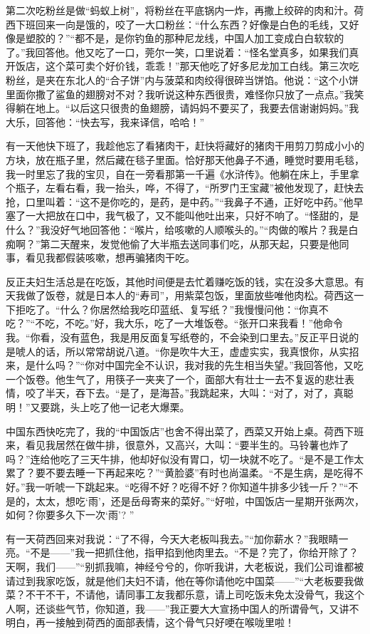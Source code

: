 \par 第二次吃粉丝是做“蚂蚁上树”，将粉丝在平底锅内一炸，再撒上绞碎的肉和汁。荷西下班回来一向是饿的，咬了一大口粉丝：“什么东西？好像是白色的毛线，又好像是塑胶的？”“都不是，是你钓鱼的那种尼龙线，中国人加工变成白白软软的了。”我回答他。他又吃了一口，莞尔一笑，口里说着：“怪名堂真多，如果我们真开饭店，这个菜可卖个好价钱，乖乖！”那天他吃了好多尼龙加工白线。第三次吃粉丝，是夹在东北人的“合子饼”内与菠菜和肉绞得很碎当饼馅。他说：“这个小饼里面你撒了鲨鱼的翅膀对不对？我听说这种东西很贵，难怪你只放了一点点。”我笑得躺在地上。“以后这只很贵的鱼翅膀，请妈妈不要买了，我要去信谢谢妈妈。”我大乐，回答他：“快去写，我来译信，哈哈！”
\par 有一天他快下班了，我趁他忘了看猪肉干，赶快将藏好的猪肉干用剪刀剪成小小的方块，放在瓶子里，然后藏在毯子里面。恰好那天他鼻子不通，睡觉时要用毛毯，我一时里忘了我的宝贝，自在一旁看那第一千遍《水浒传》。他躺在床上，手里拿个瓶子，左看右看，我一抬头，哗，不得了，“所罗门王宝藏”被他发现了，赶快去抢，口里叫着：“这不是你吃的，是药，是中药。”“我鼻子不通，正好吃中药。”他早塞了一大把放在口中，我气极了，又不能叫他吐出来，只好不响了。“怪甜的，是什么？”我没好气地回答他：“喉片，给咳嗽的人顺喉头的。”“肉做的喉片？我是白痴啊？”第二天醒来，发觉他偷了大半瓶去送同事们吃，从那天起，只要是他同事，看见我都假装咳嗽，想再骗猪肉干吃。
\par 反正夫妇生活总是在吃饭，其他时间便是去忙着赚吃饭的钱，实在没多大意思。有天我做了饭卷，就是日本人的“寿司”，用紫菜包饭，里面放些唯他肉松。荷西这一下拒吃了。“什么？你居然给我吃印蓝纸、复写纸？”我慢慢问他：“你真不吃？”“不吃，不吃。”好，我大乐，吃了一大堆饭卷。“张开口来我看！”他命令我。“你看，没有蓝色，我是用反面复写纸卷的，不会染到口里去。”反正平日说的是唬人的话，所以常常胡说八道。“你是吹牛大王，虚虚实实，我真恨你，从实招来，是什么吗？”“你对中国完全不认识，我对我的先生相当失望。”我回答他，又吃一个饭卷。他生气了，用筷子一夹夹了一个，面部大有壮士一去不复返的悲壮表情，咬了半天，吞下去。“是了，是海苔。”我跳起来，大叫：“对了，对了，真聪明！”又要跳，头上吃了他一记老大爆栗。
\par 中国东西快吃完了，我的“中国饭店”也舍不得出菜了，西菜又开始上桌。荷西下班来，看见我居然在做牛排，很意外，又高兴，大叫：“要半生的。马铃薯也炸了吗？”连给他吃了三天牛排，他却好似没有胃口，切一块就不吃了。“是不是工作太累了？要不要去睡一下再起来吃？”“黄脸婆”有时也尚温柔。“不是生病，是吃得不好。”我一听唬一下跳起来。“吃得不好？吃得不好？你知道牛排多少钱一斤？”“不是的，太太，想吃‘雨’，还是岳母寄来的菜好。”“好啦，中国饭店一星期开张两次，如何？你要多久下一次‘雨’? ”
\par 有一天荷西回来对我说：“了不得，今天大老板叫我去。”“加你薪水？”我眼睛一亮。“不是——”我一把抓住他，指甲掐到他肉里去。“不是？完了，你给开除了？天啊，我们——”“别抓我嘛，神经兮兮的，你听我讲，大老板说，我们公司谁都被请过到我家吃饭，就是他们夫妇不请，他在等你请他吃中国菜——”“大老板要我做菜？不干不干，不请他，请同事工友我都乐意，请上司吃饭未免太没骨气，我这个人啊，还谈些气节，你知道，我——”我正要大大宣扬中国人的所谓骨气，又讲不明白，再一接触到荷西的面部表情，这个骨气只好哽在喉咙里啦！
